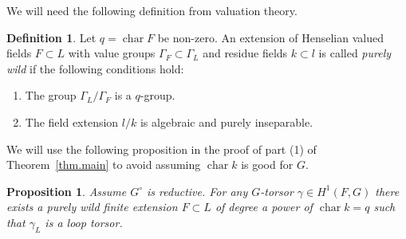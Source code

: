 \documentclass[12pt]{amsart}
\numberwithin{equation}{section}
\newtheorem{proposition}[theorem]{Proposition}
\theoremstyle{definition}
\newtheorem{definition}[theorem]{Definition}
\newcommand{\Char}{\operatorname{char}}
\begin{document}
We will need the following definition from valuation theory.
\begin{definition}
    Let $q = \Char F$ be non-zero. An extension of Henselian valued fields $F\subset L$ with value groups $\Gamma_{F}\subset \Gamma_L$ and residue fields $k\subset l$ is called \emph{purely wild} if the following conditions hold:
\begin{enumerate}
    \item The group $\Gamma_L/\Gamma_F$ is a $q$-group.
    \item The field extension $l/k$ is algebraic and purely inseparable.
\end{enumerate}
\end{definition}
We will use the following proposition in the proof of part (1) of Theorem~\ref{thm.main} to avoid assuming $\Char k$ is good for $G$.
\begin{proposition}\label{prop.loop_prime-to-p} %
    Assume $G^{\circ}$ is reductive. For any $G$-torsor $\gamma\in H^1(F,G)$ there exists a purely wild finite extension $F\subset L$ of degree a power of $\Char k = q$ such that $\gamma_L$ is a loop torsor.
\end{proposition}
\end{document}
